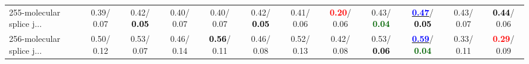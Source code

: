 \begin{table}[h]
\begin{center}
{\begin{tabular}{lc|c|c|c|c|c|c|c|c|c|c}
255-molecular splice j... &   0.39/  0.07 &   0.42/\textcolor{black}{\textbf{  0.05}} &   0.40/  0.07 &   0.40/  0.07 &   0.42/\textcolor{black}{\textbf{  0.05}} &   0.41/  0.06 & \textcolor{red}{\textbf{  0.20}}/  0.06 &   0.43/\textcolor{darkgreen}{\textbf{  0.04}} & \underline{\textcolor{blue}{\textbf{  0.47}}}/\textcolor{black}{\textbf{  0.05}} &   0.43/  0.07 & \textcolor{black}{\textbf{  0.44}}/  0.06 \\
256-molecular splice j... &   0.50/  0.12 &   0.53/  0.07 &   0.46/  0.14 & \textcolor{black}{\textbf{  0.56}}/  0.11 &   0.46/  0.08 &   0.52/  0.13 &   0.42/  0.08 &   0.53/\textcolor{black}{\textbf{  0.06}} & \underline{\textcolor{blue}{\textbf{  0.59}}}/\textcolor{darkgreen}{\textbf{  0.04}} &   0.33/  0.11 & \textcolor{red}{\textbf{  0.29}}/  0.09 \\\end{tabular}}\label{stratsALCKappa7AllReduxHalfa}
\end{center}
\end{table}
